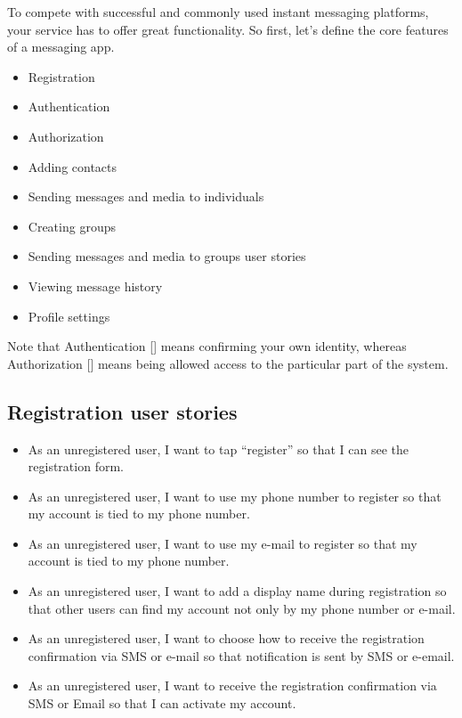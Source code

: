 To compete with successful and commonly used instant messaging platforms, your service has to offer great functionality.
So first, let’s define the core features of a messaging app.
\begin{itemize}
    \item Registration
    \item Authentication
    \item Authorization
    \item Adding contacts
    \item Sending messages and media to individuals
    \item Creating groups
    \item Sending messages and media to groups user stories
    \item Viewing message history
    \item Profile settings
\end{itemize}
Note that Authentication [\cite{burrows1989logic}] means confirming your own identity,
whereas Authorization [\cite{fagin1978authorization}] means being allowed access to the particular part of the system.

\subsection{Registration user stories}\label{subsec:registration}
\begin{itemize}
    \item As an unregistered user, I want to tap “register” so that I can see the registration form.
    \item As an unregistered user, I want to use my phone number to register so that my account is tied to my phone number.
    \item As an unregistered user, I want to use my e-mail to register so that my account is tied to my phone number.
    \item As an unregistered user, I want to add a display name during registration so that other users can find
    my account not only by my phone number or e-mail.
    \item As an unregistered user, I want to choose how to receive the registration confirmation via SMS or e-mail
    so that notification is sent by SMS or e-email.
    \item As an unregistered user, I want to receive the registration confirmation via SMS or Email so that
    I can activate my account.
\end{itemize}

